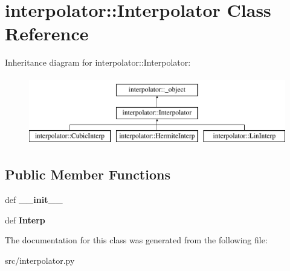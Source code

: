 \hypertarget{classinterpolator_1_1Interpolator}{
\section{interpolator::Interpolator Class Reference}
\label{db/dc2/classinterpolator_1_1Interpolator}
}
Inheritance diagram for interpolator::Interpolator:\begin{figure}[H]
\begin{center}
\leavevmode
\includegraphics[height=3cm]{db/dc2/classinterpolator_1_1Interpolator}
\end{center}
\end{figure}
\subsection*{Public Member Functions}
\begin{DoxyCompactItemize}
\item 
\hypertarget{classinterpolator_1_1Interpolator_af19c595578ba5c3e8caad32812464594}{
def {\bfseries \_\-\_\-init\_\-\_\-}}
\label{db/dc2/classinterpolator_1_1Interpolator_af19c595578ba5c3e8caad32812464594}

\item 
\hypertarget{classinterpolator_1_1Interpolator_afff6d180a690fa9939f12ceb969a0a4e}{
def {\bfseries Interp}}
\label{db/dc2/classinterpolator_1_1Interpolator_afff6d180a690fa9939f12ceb969a0a4e}

\end{DoxyCompactItemize}


The documentation for this class was generated from the following file:\begin{DoxyCompactItemize}
\item 
src/interpolator.py\end{DoxyCompactItemize}
